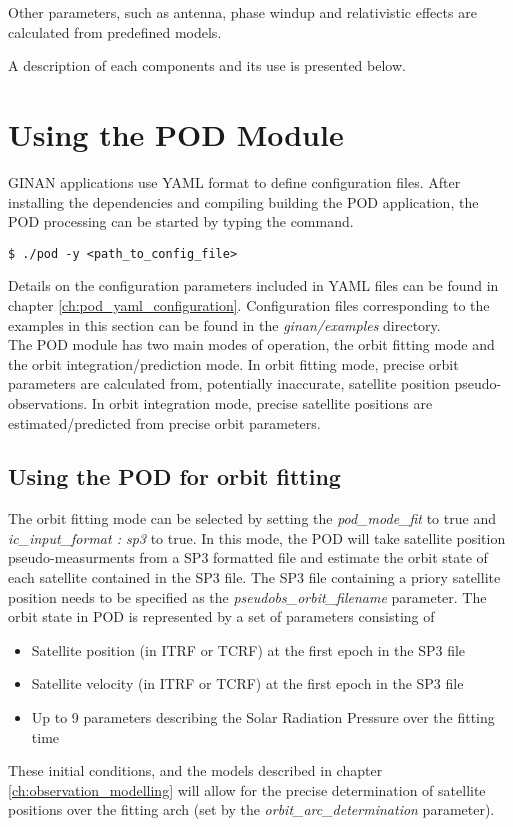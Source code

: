 Other parameters, such as antenna, phase windup and relativistic effects are calculated from predefined models.

A description of each components and its use is presented below.\\

\chapter{Using the POD Module}
GINAN applications use YAML format to define configuration files. After installing the dependencies and compiling building the POD application, the POD processing can be started by typing the command.
\begin{verbatim}
$ ./pod -y <path_to_config_file>
\end{verbatim}
Details on the configuration parameters included in YAML files can be found in chapter \ref{ch:pod_yaml_configuration}. Configuration files corresponding to the examples in this section can be found in the \textit{ginan/examples} directory.\\

The POD module has two main modes of operation, the orbit fitting mode and the orbit integration/prediction mode. In orbit fitting mode, precise orbit parameters are calculated from, potentially inaccurate, satellite position pseudo-observations. In orbit integration mode, precise satellite positions are estimated/predicted from precise orbit parameters.\\

\section{Using the POD for orbit fitting}
The orbit fitting mode can be selected by setting the \textit{ pod\_mode\_fit} to true and \textit{ic\_input\_format : sp3} to true. In this mode, the POD will take satellite position pseudo-measurments from a SP3 formatted file and estimate the orbit state of each satellite contained in the SP3 file. The SP3 file containing a priory satellite position needs to be specified as the \textit{pseudobs\_orbit\_filename} parameter.
The orbit state in POD is represented by a set of parameters consisting of 
\begin{itemize}
	\item Satellite position (in ITRF or TCRF) at the first epoch in the SP3 file
	\item Satellite velocity (in ITRF or TCRF) at the first epoch in the SP3 file
	\item Up to 9 parameters describing the Solar Radiation Pressure over the fitting time
\end{itemize}
These initial conditions, and the models described in chapter \ref{ch:observation_modelling} will allow for the precise determination of satellite positions over the fitting arch (set by the \textit{orbit\_arc\_determination} parameter).\\

